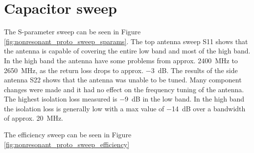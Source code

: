 \FloatBarrier
\section{Capacitor sweep}
The S-parameter sweep can be seen in Figure \ref{fig:nonresonant_proto_sweep_sparams}. The top antenna sweep S11 shows that the antenna is capable of covering the entire low band and most of the high band. In the high band the antenna have some problems from approx. \SI{2400}{MHz} to \SI{2650}{MHz}, as the return loss drops to approx. \SI{-3}{dB}. The results of the side antenna S22 shows that the antenna was unable to be tuned. Many component changes were made and it had no effect on the frequency tuning of the antenna. 
The highest isolation loss measured is \SI{-9}{dB} in the low band. In the high band the isolation loss is generally low with a max value of \SI{-14}{dB} over a bandwidth of approx. \SI{20}{MHz}. 

The efficiency sweep can be seen in Figure \ref{fig:nonresonant_proto_sweep_efficiency}



